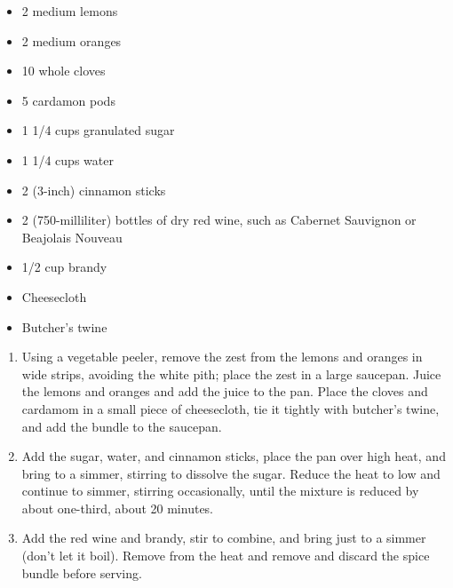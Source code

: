 \documentclass{article}
\begin{document}
\begin{framed}
    \begin{itemize}
        \item 2 medium lemons
        \item 2 medium oranges
        \item 10 whole cloves
        \item 5 cardamon pods
        \item 1 1/4 cups granulated sugar
        \item 1 1/4 cups water
        \item 2 (3-inch) cinnamon sticks
        \item 2 (750-milliliter) bottles of dry red wine, such as Cabernet Sauvignon or Beajolais Nouveau
        \item 1/2 cup brandy
        \item Cheesecloth
        \item Butcher's twine
    \end{itemize}
\end{framed}

\begin{enumerate}
    \item 
        Using a vegetable peeler, remove the zest from the lemons and oranges in wide strips, avoiding the white pith; place the zest in a large saucepan. Juice the lemons and oranges and add the juice to the pan. Place the cloves and cardamom in a small piece of cheesecloth, tie it tightly with butcher’s twine, and add the bundle to the saucepan.
    \item 
        Add the sugar, water, and cinnamon sticks, place the pan over high heat, and bring to a simmer, stirring to dissolve the sugar. Reduce the heat to low and continue to simmer, stirring occasionally, until the mixture is reduced by about one-third, about 20 minutes.
    \item 
        Add the red wine and brandy, stir to combine, and bring just to a simmer (don’t let it boil). Remove from the heat and remove and discard the spice bundle before serving.
\end{enumerate}
\newpage
\end{document}
